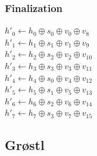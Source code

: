 \documentclass{beamer}
\begin{document}
\begin{frame}
\frametitle{Finalization}
$h'_{0} \gets h_{0} \oplus s_{0} \oplus v_{0} \oplus v_{8}$ \\
$h'_{1} \gets h_{1} \oplus s_{1} \oplus v_{1} \oplus v_{9}$ \\
$h'_{2} \gets h_{2} \oplus s_{2} \oplus v_{2} \oplus v_{10}$ \\
$h'_{3} \gets h_{3} \oplus s_{3} \oplus v_{3} \oplus v_{11}$ \\
$h'_{4} \gets h_{4} \oplus s_{0} \oplus v_{4} \oplus v_{12}$ \\
$h'_{5} \gets h_{5} \oplus s_{1} \oplus v_{5} \oplus v_{13}$ \\
$h'_{6} \gets h_{6} \oplus s_{2} \oplus v_{6} \oplus v_{14}$ \\
$h'_{7} \gets h_{7} \oplus s_{3} \oplus v_{7} \oplus v_{15}$ \\
\end{frame}

\subsection{Gr{\o}stl}


\end{document}
